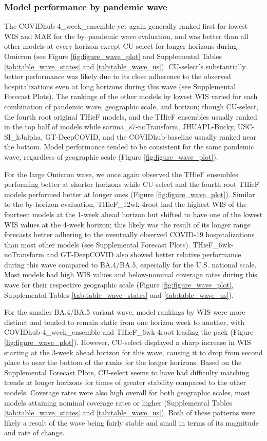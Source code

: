 \documentclass[12pt]{article}
\begin{document}
\subsubsection{Model performance by pandemic wave} \label{testing_wave}
The COVIDhub-4\_week\_ensemble yet again generally ranked first for lowest WIS and MAE for the by--pandemic wave evaluation, and was better than all other models at every horizon except CU-select for longer horizons during Omicron (see Figure \ref{fig:figure_wave_plot} and Supplemental Tables \ref{tab:table_wave_states} and \ref{tab:table_wave_us}). CU-select's substantially better performance was likely due to its close adherence to the observed hospitalizations even at long horizons during this wave (see Supplemental Forecast Plots). The rankings of the other models by lowest WIS varied for each combination of pandemic wave, geographic scale, and horizon; though CU-select, the fourth root original THieF models, and the THieF ensembles usually ranked in the top half of models while sarima\_s7-noTransform, JHUAPL-Bucky, USC-SI\_kJalpha, GT-DeepCOVID, and the COVIDhub-baseline usually ranked near the bottom. Model performance tended to be consistent for the same pandemic wave, regardless of geographic scale (Figure \ref{fig:figure_wave_plot}).

For the large Omicron wave, we once again observed the THieF ensembles performing better at shorter horizons while CU-select and the fourth root THieF models performed better at longer ones (Figure \ref{fig:figure_wave_plot}). Similar to the by-horizon evaluation, THieF\_12wk-4root had the highest WIS of the fourteen models at the 1-week ahead horizon but shifted to have one of the lowest WIS values at the 4-week horizon; this likely was the result of its longer range forecasts better adhering to the eventually observed COVID-19 hospitalizations than most other models (see Supplemental Forecast Plots). THieF\_6wk-noTransform and GT-DeepCOVID also showed better relative performance during this wave compared to BA.4/BA.5, especially for the U.S. national scale. Most models had high WIS values and below-nominal coverage rates during this wave for their respective geographic scale (Figure \ref{fig:figure_wave_plot}, Supplemental Tables \ref{tab:table_wave_states} and \ref{tab:table_wave_us}).

For the smaller BA.4/BA.5 variant wave, model rankings by WIS were more distinct and tended to remain static from one horizon week to another, with COVIDhub-4\_week\_ensemble and THieF\_6wk-4root leading the pack (Figure \ref{fig:figure_wave_plot}). However, CU-select displayed a sharp increase in WIS starting at the 3-week ahead horizon for this wave, causing it to drop from second place to near the bottom of the ranks for the longer horizons. Based on the Supplemental Forecast Plots, CU-select seems to have had difficulty matching trends at longer horizons for times of greater stability compared to the other models. Coverage rates were also high overall for both geographic scales, most models attaining nominal coverage rates or higher (Supplemental Tables \ref{tab:table_wave_states} and \ref{tab:table_wave_us}). Both of these patterns were likely a result of the wave being fairly stable and small in terms of its magnitude and rate of change.
\end{document}
